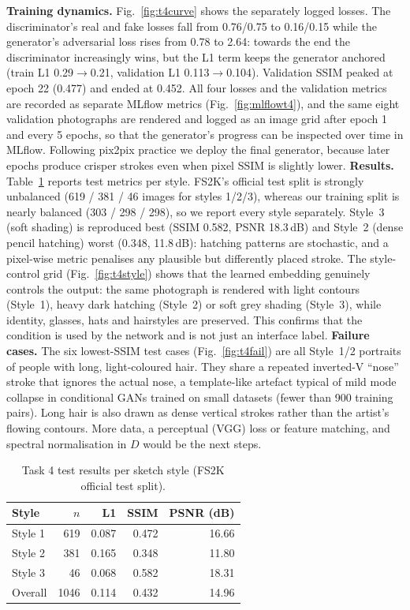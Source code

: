 \documentclass[conference]{IEEEtran}
\begin{document}
\textbf{Training dynamics.} Fig.~\ref{fig:t4curve} shows the separately logged losses. The discriminator's real and fake losses fall from 0.76/0.75 to 0.16/0.15 while the generator's adversarial loss rises from 0.78 to 2.64: towards the end the discriminator increasingly wins, but the L1 term keeps the generator anchored (train L1 0.29$\rightarrow$0.21, validation L1 0.113$\rightarrow$0.104). Validation SSIM peaked at epoch 22 (0.477) and ended at 0.452. All four losses and the validation metrics are recorded as separate MLflow metrics (Fig.~\ref{fig:mlflowt4}), and the same eight validation photographs are rendered and logged as an image grid after epoch 1 and every 5 epochs, so that the generator's progress can be inspected over time in MLflow. Following pix2pix practice we deploy the final generator, because later epochs produce crisper strokes even when pixel SSIM is slightly lower.
\textbf{Results.} Table~\ref{tab:t4} reports test metrics per style. FS2K's official test split is strongly unbalanced (619 / 381 / 46 images for styles 1/2/3), whereas our training split is nearly balanced (303 / 298 / 298), so we report every style separately. Style~3 (soft shading) is reproduced best (SSIM 0.582, PSNR 18.3\,dB) and Style~2 (dense pencil hatching) worst (0.348, 11.8\,dB): hatching patterns are stochastic, and a pixel-wise metric penalises any plausible but differently placed stroke. The style-control grid (Fig.~\ref{fig:t4style}) shows that the learned embedding genuinely controls the output: the same photograph is rendered with light contours (Style~1), heavy dark hatching (Style~2) or soft grey shading (Style~3), while identity, glasses, hats and hairstyles are preserved. This confirms that the condition is used by the network and is not just an interface label.
\textbf{Failure cases.} The six lowest-SSIM test cases (Fig.~\ref{fig:t4fail}) are all Style~1/2 portraits of people with long, light-coloured hair. They share a repeated inverted-V ``nose'' stroke that ignores the actual nose, a template-like artefact typical of mild mode collapse in conditional GANs trained on small datasets (fewer than 900 training pairs). Long hair is also drawn as dense vertical strokes rather than the artist's flowing contours. More data, a perceptual (VGG) loss or feature matching, and spectral normalisation in $D$ would be the next steps.
\begin{table}[t]\centering\caption{Task 4 test results per sketch style (FS2K official test split).}\label{tab:t4}
\begin{tabular}{lrrrr}\toprule
Style & $n$ & L1 & SSIM & PSNR (dB)\\ \midrule
Style 1 & 619 & 0.087 & 0.472 & 16.66 \\
Style 2 & 381 & 0.165 & 0.348 & 11.80 \\
Style 3 & 46 & 0.068 & 0.582 & 18.31 \\
Overall & 1046 & 0.114 & 0.432 & 14.96 \\
\bottomrule\end{tabular}\end{table}
\end{document}
